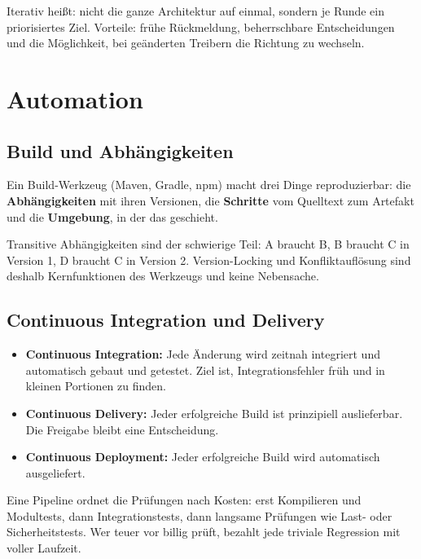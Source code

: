 \documentclass[12pt, a4paper]{article}
\begin{document}
Iterativ heißt: nicht die ganze Architektur auf einmal, sondern je Runde ein
priorisiertes Ziel. Vorteile: frühe Rückmeldung, beherrschbare Entscheidungen und
die Möglichkeit, bei geänderten Treibern die Richtung zu wechseln.

\section{Automation}

\subsection{Build und Abhängigkeiten}

Ein Build-Werkzeug (Maven, Gradle, npm) macht drei Dinge reproduzierbar: die
\textbf{Abhängigkeiten} mit ihren Versionen, die \textbf{Schritte} vom Quelltext zum
Artefakt und die \textbf{Umgebung}, in der das geschieht.

Transitive Abhängigkeiten sind der schwierige Teil: A braucht B, B braucht C in
Version 1, D braucht C in Version 2. Version-Locking und Konfliktauflösung sind
deshalb Kernfunktionen des Werkzeugs und keine Nebensache.

\subsection{Continuous Integration und Delivery}

\begin{itemize}
  \item \textbf{Continuous Integration:} Jede Änderung wird zeitnah integriert und
        automatisch gebaut und getestet. Ziel ist, Integrationsfehler früh und in
        kleinen Portionen zu finden.
  \item \textbf{Continuous Delivery:} Jeder erfolgreiche Build ist prinzipiell
        auslieferbar. Die Freigabe bleibt eine Entscheidung.
  \item \textbf{Continuous Deployment:} Jeder erfolgreiche Build wird automatisch
        ausgeliefert.
\end{itemize}

Eine Pipeline ordnet die Prüfungen nach Kosten: erst Kompilieren und Modultests,
dann Integrationstests, dann langsame Prüfungen wie Last- oder Sicherheitstests. Wer
teuer vor billig prüft, bezahlt jede triviale Regression mit voller Laufzeit.

\end{document}
